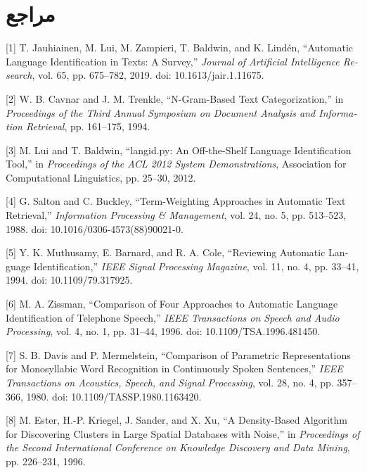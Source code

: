 \documentclass[12pt,a4paper,oneside]{report}
\begin{document}
\section*{مراجع}
\begin{latin}

[1] T. Jauhiainen, M. Lui, M. Zampieri, T. Baldwin, and K. Lind{\'e}n,
``Automatic Language Identification in Texts: A Survey,''
\textit{Journal of Artificial Intelligence Research},
vol. 65, pp. 675--782, 2019.
doi: 10.1613/jair.1.11675.

\vspace{0.4em}
[2] W. B. Cavnar and J. M. Trenkle,
``N-Gram-Based Text Categorization,''
in \textit{Proceedings of the Third Annual Symposium on Document
Analysis and Information Retrieval},
pp. 161--175, 1994.

\vspace{0.4em}
[3] M. Lui and T. Baldwin,
``langid.py: An Off-the-Shelf Language Identification Tool,''
in \textit{Proceedings of the ACL 2012 System Demonstrations},
Association for Computational Linguistics,
pp. 25--30, 2012.

\vspace{0.4em}
[4] G. Salton and C. Buckley,
``Term-Weighting Approaches in Automatic Text Retrieval,''
\textit{Information Processing \& Management},
vol. 24, no. 5, pp. 513--523, 1988.
doi: 10.1016/0306-4573(88)90021-0.

\vspace{0.4em}
[5] Y. K. Muthusamy, E. Barnard, and R. A. Cole,
``Reviewing Automatic Language Identification,''
\textit{IEEE Signal Processing Magazine},
vol. 11, no. 4, pp. 33--41, 1994.
doi: 10.1109/79.317925.

\vspace{0.4em}
[6] M. A. Zissman,
``Comparison of Four Approaches to Automatic Language Identification
of Telephone Speech,''
\textit{IEEE Transactions on Speech and Audio Processing},
vol. 4, no. 1, pp. 31--44, 1996.
doi: 10.1109/TSA.1996.481450.

\vspace{0.4em}
[7] S. B. Davis and P. Mermelstein,
``Comparison of Parametric Representations for Monosyllabic Word
Recognition in Continuously Spoken Sentences,''
\textit{IEEE Transactions on Acoustics, Speech, and Signal Processing},
vol. 28, no. 4, pp. 357--366, 1980.
doi: 10.1109/TASSP.1980.1163420.

\vspace{0.4em}
[8] M. Ester, H.-P. Kriegel, J. Sander, and X. Xu,
``A Density-Based Algorithm for Discovering Clusters in Large Spatial
Databases with Noise,''
in \textit{Proceedings of the Second International Conference on
Knowledge Discovery and Data Mining},
pp. 226--231, 1996.


\end{latin}
\end{document}
